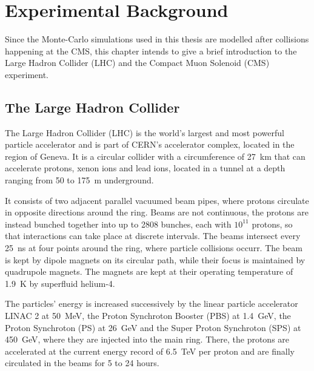 \chapter{Experimental Background}
\label{ch:experiment}
Since the Monte-Carlo simulations used in this thesis are modelled after collisions happening at the CMS, this chapter intends to give a brief introduction to the Large Hadron Collider (LHC) and the Compact Muon Solenoid (CMS) experiment.

\section{The Large Hadron Collider}
The Large Hadron Collider (LHC) is the world's largest and most powerful particle accelerator and is part of CERN's accelerator complex, located in the region of Geneva. It is a circular collider with a circumference of \SI{27}{km} that can accelerate protons, xenon ions and lead ions, located in a tunnel at a depth ranging from 50 to \SI{175}{m} underground.

It consists of two adjacent parallel vacuumed beam pipes, where protons circulate in opposite directions around the ring. Beams are not continuous, the protons are instead bunched together into up to 2808 bunches, each with $10^11$ protons, so that interactions can take place at discrete intervals. The beams intersect every \SI{25}{ns} at four points around the ring, where particle collisions occurr. The beam is kept by dipole magnets on its circular path, while their focus is maintained by quadrupole magnets. The magnets are kept at their operating temperature of \SI{1.9}{K} by superfluid helium-4.

The particles' energy is increased successively by the linear particle accelerator LINAC 2 at \SI{50}{MeV}, the Proton Synchroton Booster (PBS) at \SI{1.4}{GeV}, the Proton Synchroton (PS) at \SI{26}{GeV} and the Super Proton Synchroton (SPS) at \SI{450}{GeV}, where they are injected into the main ring. There, the protons are accelerated at the current energy record of \SI{6.5}{TeV} per proton and are finally circulated in the beams for 5 to 24 hours.

